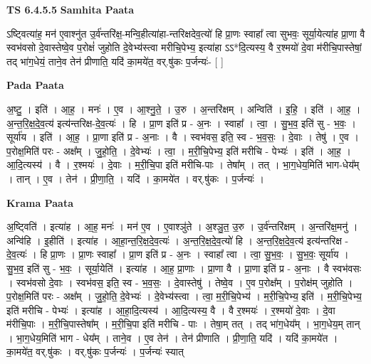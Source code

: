 \documentclass[17pt]{extarticle}
\begin{document}
\textbf{TS 6.4.5.5 } \newline
\textbf{Samhita Paata} \newline

ऽष्ट्वित्या॑ह॒ मन॑ ए॒वाश्नु॑त उ॒र्व॑न्तरि॑क्ष॒-मन्वि॒हीत्या॑हा-न्तरिक्षदेव॒त्यो॑ हि प्रा॒णः स्वाहा᳚ त्वा सुभवः॒ सूर्या॒येत्या॑ह प्रा॒णा वै स्वभ॑वसो दे॒वास्तेष्वे॒व प॒रोक्षं॑ जुहोति दे॒वेभ्य॑स्त्वा मरीचि॒पेभ्य॒ इत्या॑हा ऽऽ*दि॒त्यस्य॒ वै र॒श्मयो॑ दे॒वा म॑रीचि॒पास्तेषां॒ तद् भा॑ग॒धेयं॒ ताने॒व तेन॑ प्रीणाति॒ यदि॑ का॒मये॑त॒ वर्.षु॑कः प॒र्जन्यः॑- [  ] \newline

\textbf{Pada Paata} \newline

अ॒ष्टु॒ । इति॑ । आ॒ह॒ । मनः॑ । ए॒व । आ॒श्नु॒ते॒ । उ॒रु । अ॒न्तरि॑क्षम् । अन्विति॑ । इ॒हि॒ । इति॑ । आ॒ह॒ । अ॒न्त॒रि॒क्ष॒दे॒व॒त्य॑ इत्य॑न्तरिक्ष-दे॒व॒त्यः॑ । हि । प्रा॒ण इति॑ प्र - अ॒नः । स्वाहा᳚ । त्वा॒ । सु॒भ॒व॒ इति॑ सु - भ॒वः॒ । सूर्या॑य । इति॑ । आ॒ह॒ । प्रा॒णा इति॑ प्र - अ॒नाः । वै । स्वभ॑वस॒ इति॒ स्व - भ॒व॒सः॒ । दे॒वाः । तेषु॑ । ए॒व । प॒रोक्ष॒मिति॑ परः - अक्ष᳚म् । जु॒हो॒ति॒ । दे॒वेभ्यः॑ । त्वा॒ । म॒री॒चि॒पेभ्य॒ इति॑ मरीचि - पेभ्यः॑ । इति॑ । आ॒ह॒ । आ॒दि॒त्यस्य॑ । वै । र॒श्मयः॑ । दे॒वाः । म॒री॒चि॒पा इति॑ मरीचि-पाः । तेषा᳚म् । तत् । भा॒ग॒धेय॒मिति॑ भाग-धेय᳚म् । तान् । ए॒व । तेन॑ । प्री॒णा॒ति॒ । यदि॑ । का॒मये॑त । वर्.षु॑कः । प॒र्जन्यः॑ ।  \newline


\textbf{Krama Paata} \newline

अ॒ष्ट्विति॑ । इत्या॑ह । आ॒ह॒ मनः॑ । मन॑ ए॒व । ए॒वाश्ञु॑ते । अ॒श्ञु॒त॒ उ॒रु । उ॒र्व॑न्तरि॑क्षम् । अ॒न्तरि॑क्ष॒मनु॑ । अन्वि॑हि । इ॒हीति॑ । इत्या॑ह । आ॒हा॒न्त॒रि॒क्ष॒दे॒व॒त्यः॑ । अ॒न्त॒रि॒क्ष॒दे॒व॒त्यो॑ हि । अ॒न्त॒रि॒क्ष॒दे॒व॒त्य॑ इत्य॑न्तरिक्ष - दे॒व॒त्यः॑ । हि प्रा॒णः । प्रा॒णः स्वाहा᳚ । प्रा॒ण इति॑ प्र - अ॒नः । स्वाहा᳚ त्वा । त्वा॒ सु॒भ॒वः॒ । सु॒भ॒वः॒ सूर्या॑य । सु॒भ॒व॒ इति॑ सु - भ॒वः॒ । सूर्या॒येति॑ । इत्या॑ह । आ॒ह॒ प्रा॒णाः । प्रा॒णा वै । प्रा॒णा इति॑ प्र - अ॒नाः । वै स्वभ॑वसः । स्वभ॑वसो दे॒वाः । स्वभ॑वस॒ इति॒ स्व - भ॒व॒सः॒ । दे॒वास्तेषु॑ । तेष्वे॒व । ए॒व प॒रोक्ष᳚म् । प॒रोक्ष॑म् जुहोति । प॒रोक्ष॒मिति॑ परः - अक्ष᳚म् । जु॒हो॒ति॒ दे॒वेभ्यः॑ । दे॒वेभ्य॑स्त्वा । त्वा॒ म॒री॒चि॒पेभ्य॑ । म॒री॒चि॒पेभ्य॒ इति॑ । म॒री॒चि॒पेभ्य॒ इति॑ मरीचि - पेभ्यः॑ । इत्या॑ह । आ॒हा॒दि॒त्यस्य॑ । आ॒दि॒त्यस्य॒ वै । वै र॒श्मयः॑ । र॒श्मयो॑ दे॒वाः । दे॒वा म॑रीचि॒पाः । म॒री॒चि॒पास्तेषा᳚म् । म॒री॒चि॒पा इति॑ मरीचि - पाः । तेषा॒म् तत् । तद् भा॑ग॒धेय᳚म् । भा॒ग॒धेय॒म् तान् । भा॒ग॒धेय॒मिति॑ भाग - धेय᳚म् । ताने॒व । ए॒व तेन॑ । तेन॑ प्रीणाति । प्री॒णा॒ति॒ यदि॑ । यदि॑ का॒मये॑त । का॒मये॑त॒ वर्.षु॑कः । वर्.षु॑कः प॒र्जन्यः॑ । प॒र्जन्यः॑ स्यात् \newline
\end{document}

